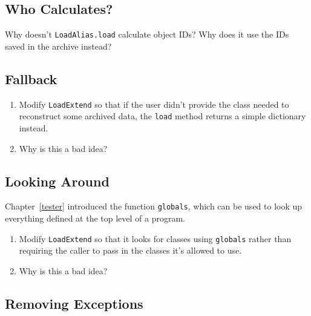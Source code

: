 \documentclass{scrbook}
\newcommand{\chapref}[1]{Chapter~\ref{#1}}
\begin{document}
\subsection*{Who Calculates?}


Why doesn't \texttt{LoadAlias.load} calculate object IDs?
Why does it use the IDs saved in the archive instead?

\subsection*{Fallback}

\begin{enumerate}

\item 

Modify \texttt{LoadExtend} so that
    if the user didn't provide the class needed to reconstruct some archived data,
    the \texttt{load} method returns a simple dictionary instead.



\item 

Why is this a bad idea?



\end{enumerate}

\subsection*{Looking Around}


\chapref{tester} introduced the function \texttt{globals},
which can be used to look up everything defined at the top level of a program.

\begin{enumerate}

\item 

Modify \texttt{LoadExtend} so that it looks for classes using \texttt{globals}
    rather than requiring the caller to pass in
    the classes it's allowed to use.



\item 

Why is this a bad idea?



\end{enumerate}

\subsection*{Removing Exceptions}
\end{document}
